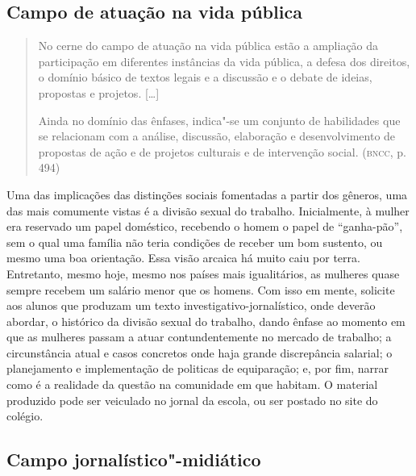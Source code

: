 \documentclass[12pt]{extarticle}
\begin{document}
\subsection{Campo de atuação na vida pública}

\begin{quote}
No cerne do campo de atuação na vida pública estão a ampliação da
participação em diferentes instâncias da vida pública, a defesa dos
direitos, o domínio básico de textos legais e a discussão e o debate de
ideias, propostas e projetos. {[}\ldots{}{]}

Ainda no domínio das ênfases, indica"-se um conjunto de habilidades que
se relacionam com a análise, discussão, elaboração e desenvolvimento de
propostas de ação e de projetos culturais e de intervenção social.
(\textsc{bncc}, p. 494)
\end{quote}

Uma das implicações das distinções sociais fomentadas a partir dos
gêneros, uma das mais comumente vistas é a divisão sexual do trabalho.
Inicialmente, à mulher era reservado um papel doméstico, recebendo o
homem o papel de ``ganha-pão'', sem o qual uma família não teria
condições de receber um bom sustento, ou mesmo uma boa orientação.
Essa visão arcaica há muito caiu por terra. Entretanto, mesmo hoje,
mesmo nos países mais igualitários, as mulheres quase sempre recebem
um salário menor que os homens. Com isso em mente, solicite aos alunos
que produzam um texto investigativo-jornalístico, onde deverão
abordar, o histórico da divisão sexual do trabalho, dando ênfase ao
momento em que as mulheres passam a atuar contundentemente no mercado
de trabalho; a circunstância atual e casos concretos onde haja grande
discrepância salarial; o planejamento e implementação de politicas de
equiparação; e, por fim, narrar como é a realidade da questão na
comunidade em que habitam. O material produzido pode ser veiculado no
jornal da escola, ou ser postado no site do colégio.


\subsection{Campo jornalístico"-midiático}
\end{document}
